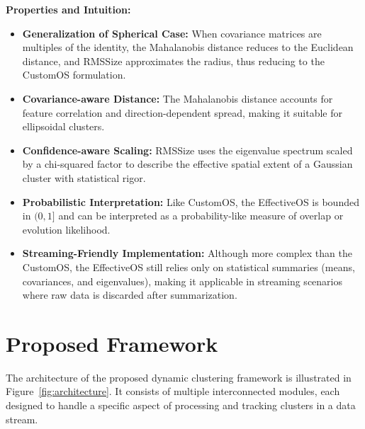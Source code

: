 \textbf{Properties and Intuition:}
\begin{itemize}
      \item \textbf{Generalization of Spherical Case:} When covariance matrices are multiples
            of the identity, the Mahalanobis distance reduces to the Euclidean distance, and
            RMSSize approximates the radius, thus reducing to the CustomOS formulation.
      \item \textbf{Covariance-aware Distance:} The Mahalanobis distance accounts for
            feature correlation and direction-dependent spread, making it suitable for ellipsoidal clusters.
      \item \textbf{Confidence-aware Scaling:} RMSSize uses the eigenvalue spectrum scaled
            by a chi-squared factor to describe the effective spatial extent of a Gaussian cluster
            with statistical rigor.
      \item \textbf{Probabilistic Interpretation:} Like CustomOS, the EffectiveOS is bounded
            in $ (0, 1] $ and can be interpreted as a probability-like measure of overlap or evolution
            likelihood.
      \item \textbf{Streaming-Friendly Implementation:} Although more complex than the CustomOS,
            the EffectiveOS still relies only on statistical summaries (means, covariances, and eigenvalues),
            making it applicable in streaming scenarios where raw data is discarded after summarization.
\end{itemize}

\section{Proposed Framework}\label{sec:proposed_framework}

The architecture of the proposed dynamic clustering framework is illustrated in
Figure~\ref{fig:architecture}. It consists of multiple interconnected modules,
each designed to handle a specific aspect of processing and tracking clusters
in a data stream.

